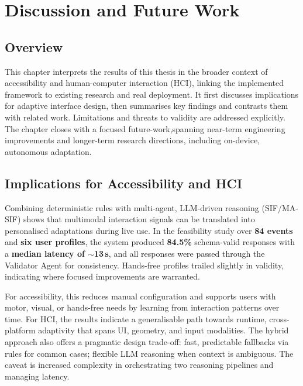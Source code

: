 \chapter{Discussion and Future Work}
\label{ch:chapter7}
\section{Overview}
This chapter interprets the results of this thesis in the broader context of accessibility and human-computer interaction (HCI), linking the implemented framework to existing research and real deployment. It first discusses implications for adaptive interface design, then summarises key findings and contrasts them with related work. Limitations and threats to validity are addressed explicitly. The chapter closes with a focused future-work,spanning near-term engineering improvements and longer-term research directions, including on-device, autonomous adaptation.

\section{Implications for Accessibility and HCI}
Combining deterministic rules with multi-agent, LLM-driven reasoning (SIF/MA-SIF) shows that multimodal interaction signals can be translated into personalised adaptations during live use. In the feasibility study over \textbf{84 events} and \textbf{six user profiles}, the system produced \textbf{84.5\%} schema-valid responses with a \textbf{median latency of $\sim$13\,s}, and all responses were passed through the Validator Agent for consistency. Hands-free profiles trailed slightly in validity, indicating where focused improvements are warranted.

For accessibility, this reduces manual configuration and supports users with motor, visual, or hands-free needs by learning from interaction patterns over time. For HCI, the results indicate a generalisable path towards runtime, cross-platform adaptivity that spans UI, geometry, and input modalities. The hybrid approach also offers a pragmatic design trade-off: fast, predictable fallbacks via rules for common cases; flexible LLM reasoning when context is ambiguous. The caveat is increased complexity in orchestrating two reasoning pipelines and managing latency.

